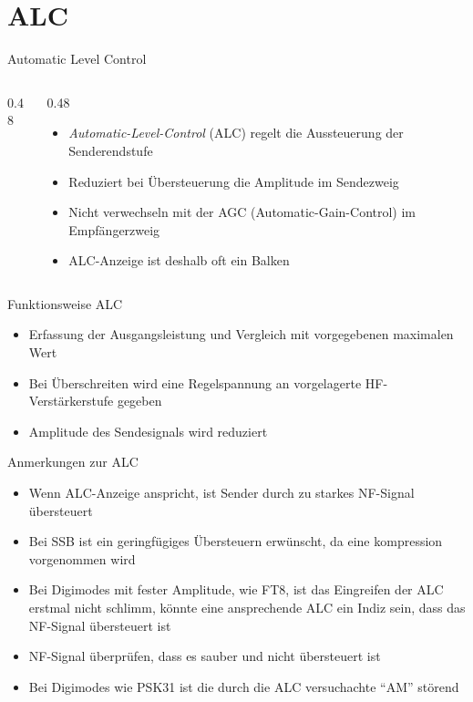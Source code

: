 \section{ALC}
\label{section:alc}

\begin{frame}{Automatic Level Control}
    \begin{columns}
        \begin{column}{0.48\linewidth}
        \end{column}
        \begin{column}{0.48\linewidth}
            \begin{itemize}
                \item \emph{Automatic-Level-Control} (ALC) regelt die Aussteuerung der Senderendstufe
                \item Reduziert bei Übersteuerung die Amplitude im Sendezweig
                \item Nicht verwechseln mit der AGC (Automatic-Gain-Control) im Empfängerzweig
                \item ALC-Anzeige ist deshalb oft ein Balken
            \end{itemize}
        \end{column}
    \end{columns}
\end{frame}

\begin{frame}{Funktionsweise ALC}
    \begin{center}
    \end{center}
    \begin{itemize}
        \item Erfassung der Ausgangsleistung und Vergleich mit vorgegebenen maximalen Wert
        \item Bei Überschreiten wird eine Regelspannung an vorgelagerte HF-Verstärkerstufe gegeben
        \item Amplitude des Sendesignals wird reduziert
    \end{itemize}
\end{frame}

\begin{frame}{Anmerkungen zur ALC}
    \begin{itemize}
        \item Wenn ALC-Anzeige anspricht, ist Sender durch zu starkes NF-Signal
        übersteuert
        \item Bei SSB ist ein geringfügiges Übersteuern erwünscht, da eine
        kompression vorgenommen wird
        \item Bei Digimodes mit fester Amplitude, wie FT8, ist das Eingreifen
        der ALC erstmal nicht schlimm, könnte eine ansprechende ALC ein Indiz
        sein, dass das NF-Signal übersteuert ist
        \item NF-Signal überprüfen, dass es sauber und nicht übersteuert ist
        \item Bei Digimodes wie PSK31 ist die durch die ALC versuchachte
        \enquote{AM} störend
    \end{itemize}
\end{frame}

